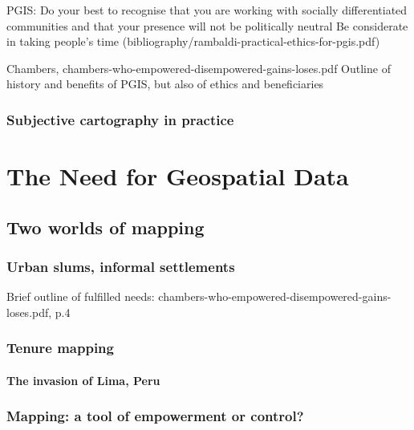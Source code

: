\documentclass[11pt]{report}
\begin{document}
PGIS: 
Do your best to recognise that you are working with socially differentiated communities and that your presence will not be politically neutral
Be considerate in taking people’s time
(bibliography/rambaldi-practical-ethics-for-pgis.pdf)

Chambers, chambers-who-empowered-disempowered-gains-loses.pdf
Outline of history and benefits of PGIS, but also of ethics and beneficiaries

\subsection{Subjective cartography in practice}

\chapter{The Need for Geospatial Data}
\section{Two worlds of mapping}
\subsection{Urban slums, informal settlements}

Brief outline of fulfilled needs: chambers-who-empowered-disempowered-gains-loses.pdf, p.4

\subsection{Tenure mapping}
\subsubsection{The invasion of Lima, Peru}

\subsection{Mapping: a tool of empowerment or control?}
\end{document}
